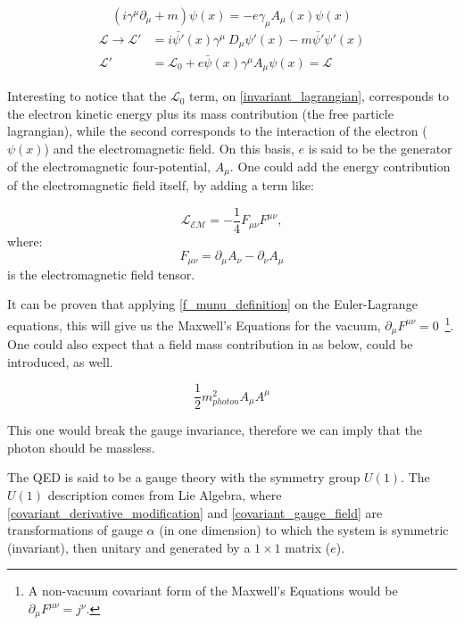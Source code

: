 \begin{equation}
        (i \gamma^\mu \partial_\mu + m)\psi(x) = -e\gamma_\mu A_\mu(x) \psi(x) 
    \label{invariant_dirac_equation}
\end{equation}
\begin{equation}
    \begin{split}
        \mathcal{L} \rightarrow \mathcal{L'} &= i\bar{\psi'}(x)\gamma^\mu\ D_\mu\psi'(x)-m\bar{\psi'}\psi'(x) \\
        \mathcal{L'} &= \mathcal{L_{\text{0}}} + e\bar{\psi}(x)\gamma^\mu A_\mu \psi(x) = \mathcal{L}
    \end{split}
    \label{invariant_lagrangian}
\end{equation}

Interesting to notice that the $\mathcal{L_{\text{0}}}$ term, on \ref{invariant_lagrangian}, corresponds to the electron kinetic energy plus its mass contribution (the free particle lagrangian), while the second corresponds to the interaction of the electron ($\psi(x)$) and the electromagnetic field. On this basis, $e$ is said to be the generator of the electromagnetic four-potential, $A_\mu$. One could add the energy contribution of the electromagnetic field itself, by adding a term like:

\begin{equation}
    \mathcal{L_{\text{EM}}} = - \frac{1}{4} F_{\mu\nu} F^{\mu\nu},
\label{lagragian_em}
\end{equation}
where:
\begin{equation}
    F_{\mu\nu} = \partial_\mu A_\nu - \partial_\nu A_\mu
\label{f_munu_definition}
\end{equation}
is the electromagnetic field tensor.

It can be proven that applying \ref{f_munu_definition} on the Euler-Lagrange equations, this will give us the Maxwell's Equations for the vacuum, $\partial_{\mu} F^{\mu\nu} = 0$~\footnote{A non-vacuum covariant form of the Maxwell's Equations would be $\partial_{\mu} F^{\mu\nu} = j^{\nu}$.}. One could also expect that a field mass contribution in as below, could be introduced, as well.

\begin{equation}
    \frac{1}{2}m_{photon}^2 A_\mu A^\mu
\label{photon_mass_term}
\end{equation}

This one would break the gauge invariance, therefore we can imply that the photon should be massless.

The QED is said to be a gauge theory with the symmetry group $U(1)$. The $U(1)$ description comes from Lie Algebra, where \ref{covariant_derivative_modification} and \ref{covariant_gauge_field} are transformations of gauge $\alpha$ (in one dimension) to which the system is symmetric (invariant), then unitary and generated by a $1 \times 1$ matrix ($e$).

